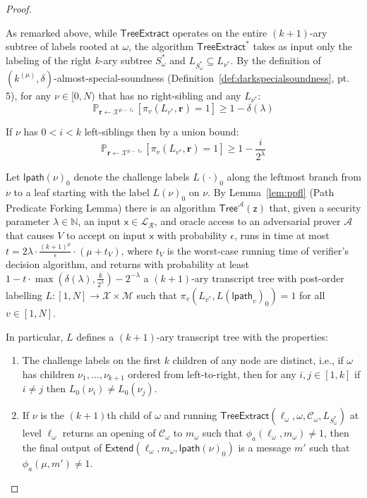 \documentclass{article}
\theoremstyle{definition}
\begin{document}
\begin{proof}
\begin{itemize}
\end{itemize}
As remarked above, while $\textsf{TreeExtract}$ operates on the entire $(k+1)$-ary subtree of labels rooted at $\omega$, the algorithm $\textsf{TreeExtract}^*$ takes as input only the labeling of the right $k$-ary subtree $S^*_\omega$ and $L_{S^*_\omega} \subseteq L_{\nu^*}$. 
By the definition of $(k^{(\mu)}, \delta)$-almost-special-soundness (Definition~\ref{def:darkspecialsoundness}, pt. 5), for any $\nu \in [0,N)$ that has no right-sibling and any $L_{\nu^*}$: 
$$\mathbb{P}_{\mathbf{r} \leftarrow \mathcal{X}^{\mu - \ell_\nu}}[ \pi_v(L_{v^*}, \mathbf{r}) = 1 ] \geq 1 - \delta(\lambda)$$  

If $\nu$ has $0 < i < k$ left-siblings then by a union bound: 
$$\mathbb{P}_{\mathbf{r} \leftarrow \mathcal{X}^{\mu - \ell_\nu}}[ \pi_v(L_{v^*}, \mathbf{r}) = 1 ] \geq 1 - \frac{i}{2^\lambda} $$ 

Let $\textsf{lpath}(\nu)_0$ denote the challenge labels $L(\cdot)_0$ along the leftmost branch from $\nu$ to a leaf starting with the label $L(\nu)_0$ on $\nu$. By Lemma~\ref{lem:ppfl} (Path Predicate Forking Lemma) there is an algorithm $\textsf{Tree}^\mathcal{A}(\mathsf{z})$ that, given a security parameter $\lambda \in \mathbb{N}$, an input $\mathsf{x} \in \mathcal{L}_\mathcal{R}$, and oracle access to an adversarial prover $\mathcal{A}$ that causes $V$ to accept on input $\mathsf{x}$ with probability $\epsilon$, runs in time at most $t = 2\lambda \cdot \frac{(k+1)^\mu}{\epsilon} \cdot (\mu + t_V)$, where $t_V$ is the worst-case running time of verifier's decision algorithm, and returns with probability at least $1 - t \cdot \max(\delta(\lambda), \frac{k}{2^\lambda}) - 2^{-\lambda}$ a $(k+1)$-ary transcript tree with post-order labelling $L:[1,N] \rightarrow \mathcal{X}\times \mathcal{M}$ such that $\pi_v(L_{v^*}, L(\textsf{lpath}_v)_0) = 1$ for all $v \in [1,N]$. 


 In particular, $L$ defines a $(k+1)$-ary transcript tree with the properties: 
\begin{enumerate}
\item The challenge labels on the first $k$ children of any node are distinct, i.e., if $\omega$ has children $\nu_1,...,\nu_{k+1}$ ordered from left-to-right, then for any $i, j \in [1, k]$ if $i \neq j$ then $L_0(\nu_i) \neq L_0(\nu_j)$. 
\item  If $\nu$ is the $(k+1)$th child of $\omega$ and running $\textsf{TreeExtract}(\ell_\omega, \omega, \mathcal{C}_\omega, L_{S^*_\omega})$ at level $\ell_\omega$ returns an opening of $\mathcal{C}_\omega$ to $m_\omega$ such that $\phi_a(\ell_\omega, m_\omega) \neq 1$, then the final output of $\textsf{Extend}(\ell_\omega, m_\omega, \textsf{lpath}(\nu)_0)$ is a message $m'$ such that $\phi_a(\mu, m') \neq 1$. 
\end{enumerate} 


\end{proof}
\end{document}
